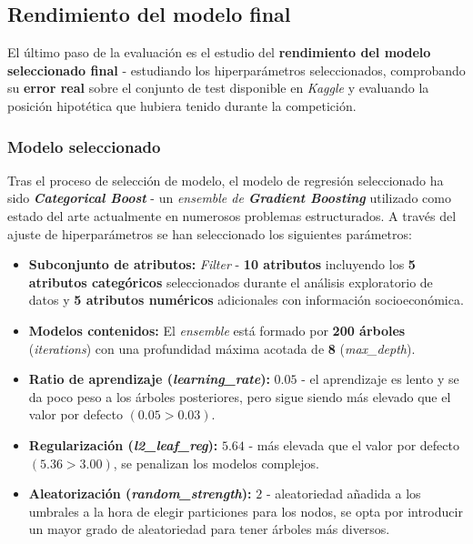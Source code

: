 \subsection{Rendimiento del modelo final}

El último paso de la evaluación es el estudio del \textbf{rendimiento del modelo seleccionado final} - estudiando los hiperparámetros seleccionados, comprobando su \textbf{error real} sobre el conjunto de test disponible en \textit{Kaggle} y evaluando la posición hipotética que hubiera tenido durante la competición.

\subsubsection{Modelo seleccionado}

Tras el proceso de selección de modelo, el modelo de regresión seleccionado ha sido \textbf{\textit{Categorical Boost}} - un \textit{ensemble de \textbf{Gradient Boosting}} utilizado como estado del arte actualmente en numerosos problemas estructurados. A través del ajuste de hiperparámetros se han seleccionado los siguientes parámetros:

\begin{itemize}[parsep=1pt, itemsep=2pt, topsep=1pt]
	\item \textbf{Subconjunto de atributos:} \textit{Filter} - \textbf{10 atributos} incluyendo los \textbf{5 atributos categóricos} seleccionados durante el análisis exploratorio de datos y \textbf{5 atributos numéricos} adicionales con información socioeconómica.
	\item \textbf{Modelos contenidos:} El \textit{ensemble} está formado por \textbf{200 árboles} (\textit{iterations}) con una profundidad máxima acotada de \textbf{8} (\textit{max\_depth}).
	\item \textbf{Ratio de aprendizaje (\textit{learning\_rate}):} $0.05$ - el aprendizaje es lento y se da poco peso a los árboles posteriores, pero sigue siendo más elevado que el valor por defecto $(0.05 > 0.03)$.
	\item \textbf{Regularización (\textit{l2\_leaf\_reg}):} $5.64$ - más elevada que el valor por defecto $(5.36>3.00)$, se penalizan los modelos complejos.
	\item \textbf{Aleatorización (\textit{random\_strength}):} $2$ - aleatoriedad añadida a los umbrales a la hora de elegir particiones para los nodos, se opta por introducir un mayor grado de aleatoriedad para tener árboles más diversos.
\end{itemize}


